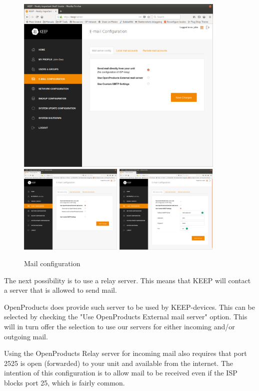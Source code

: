 \documentclass[12pt,a4paper,titlepage]{article}
\begin{document}
\begin{figure}[h!]
\centering
\includegraphics[width=10cm]{./img/smtp_config}
\includegraphics[width=4.93cm]{./img/smtp_config-2}
\includegraphics[width=4.93cm]{./img/smtp_config-3}
\caption{Mail configuration}
\end{figure}
The next possibility is to use a relay server. This means that KEEP will contact a server that is allowed to send mail.

OpenProducts does provide such server to be used by KEEP-devices. This can be selected by checking the "Use OpenProducts External mail server" option. This will in turn offer the selection to use our servers for either incoming and/or outgoing mail.

Using the OpenProducts Relay server for incoming mail also requires that port 2525 is open (forwarded) to your unit and available from the internet. The intention of this configuration is to allow mail to be received even if the ISP blocks port 25, which is fairly common.
\end{document}
